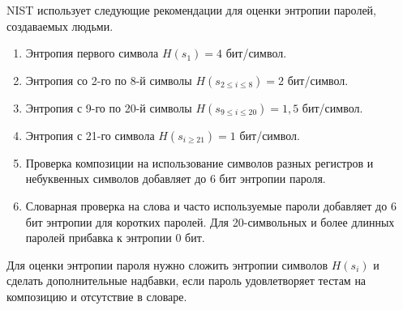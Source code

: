 \documentclass[10pt,a4paper]{book}
\begin{document}
NIST использует следующие рекомендации для оценки энтропии паролей, создаваемых людьми.
\begin{enumerate}
    \item Энтропия первого символа $H(s_1) = 4$ бит/символ.
    \item Энтропия со 2-го по 8-й символы $H(s_{2 \leq i \leq 8}) = 2$ бит/символ.
    \item Энтропия с 9-го по 20-й символы $H(s_{9 \leq i \leq 20}) = 1{,}5$ бит/символ.
    \item Энтропия с 21-го символа $H(s_{i \geq 21}) = 1$ бит/символ.
    \item Проверка композиции на использование символов разных регистров и небуквенных символов добавляет до 6 бит энтропии пароля.
    \item Словарная проверка на слова и часто используемые пароли добавляет до 6 бит энтропии для коротких паролей. Для 20-символьных и более длинных паролей прибавка к энтропии 0 бит.
\end{enumerate}

Для оценки энтропии пароля нужно сложить энтропии символов $H(s_i)$ и сделать дополнительные надбавки, если пароль удовлетворяет тестам на композицию и отсутствие в словаре.

\begin{table}[!ht]
    \centering
    \caption{Оценка NIST предполагаемой энтропии паролей\label{tab:password-entropy}}
\end{table}
\end{document}
